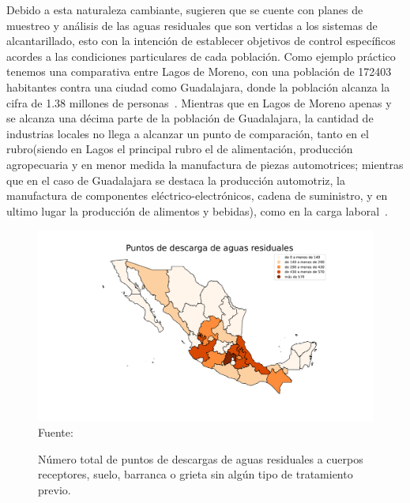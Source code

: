 Debido a esta naturaleza cambiante, \cite{Fair2008} sugieren que se cuente con planes de muestreo y análisis de las aguas residuales que son vertidas a los sistemas de alcantarillado, esto con la intención de establecer objetivos de control específicos acordes a las condiciones particulares de cada población. Como ejemplo práctico tenemos una comparativa entre Lagos de Moreno, con una población de 172403 habitantes contra una ciudad como Guadalajara, donde la población alcanza la cifra de 1.38 millones de personas~\citep{INEGIJAL}. Mientras que en Lagos de Moreno apenas y se alcanza una décima parte de la población de Guadalajara, la cantidad de industrias locales no llega a alcanzar un punto de comparación, tanto en el rubro(siendo en Lagos el principal rubro el de alimentación, producción agropecuaria y en menor medida la manufactura de piezas automotrices; mientras que en el caso de Guadalajara se destaca la producción automotriz, la manufactura de componentes eléctrico-electrónicos, cadena de suministro, y en ultimo lugar la producción de alimentos y bebidas), como en la carga laboral~\citep{Eunice2022,Lagosjal}.
\begin{figure}[H]
	\centering
	\includegraphics[scale=0.45]{../Images/DescargasTotales.pdf}
	\\\small{Fuente: \cite{Censo2021}}
	\caption{Número total de puntos de descargas de aguas residuales a cuerpos receptores, suelo, barranca o grieta sin algún tipo de tratamiento previo.}\label{puntosdesecho}
\end{figure}
